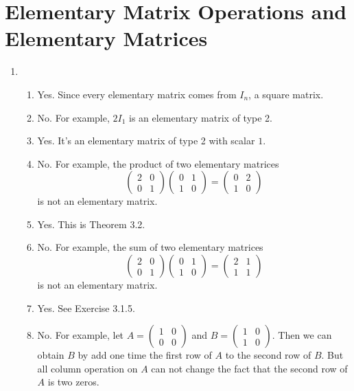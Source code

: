 \section{Elementary Matrix Operations and Elementary Matrices}
\begin{enumerate}
\item \begin{enumerate}
\item Yes. Since every elementary matrix comes from $I_n$, a square matrix.
\item No. For example, $2I_1$ is an elementary matrix of type 2.
\item Yes. It's an elementary matrix of type 2 with scalar $1$.
\item No. For example, the product of two elementary matrices 
\[\left(\begin{array}{cc}2&0\\0&1\end{array}\right)\left(\begin{array}{cc}0&1\\1&0\end{array}\right)=\left(\begin{array}{cc}0&2\\1&0\end{array}\right)\]
is not an elementary matrix.
\item Yes. This is Theorem 3.2.
\item No. For example, the sum of two elementary matrices 
\[\left(\begin{array}{cc}2&0\\0&1\end{array}\right)\left(\begin{array}{cc}0&1\\1&0\end{array}\right)=\left(\begin{array}{cc}2&1\\1&1\end{array}\right)\]
is not an elementary matrix.
\item Yes. See Exercise 3.1.5.
\item No. For example, let $A=\left(\begin{array}{cc}1&0\\0&0\end{array}\right)$ and $B=\left(\begin{array}{cc}1&0\\1&0\end{array}\right)$. Then we can obtain $B$ by add one time the first row of $A$ to the second row of $B$. But all column operation on $A$ can not change the fact that the second row of $A$ is two zeros.

\end{enumerate}
\end{enumerate}
